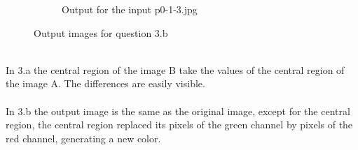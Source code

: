 \begin{enumerate}[label=\emph{\alph*)}]
\begin{figure}[h!]
\begin{subfigure}{0.5\textwidth}
  \caption{Output for the input p0-1-3.jpg}
  \label{fig:sfig2}
\end{subfigure}
\caption{Output images for question 3.b}
\label{fig:fig}
\end{figure}
\\In 3.a the central region of the image B take the values of the central region of the image A. The differences are easily visible.
\\\\In 3.b the output image is the same as the original image, except for the central region, the central region replaced its pixels of the green channel by pixels of the red channel, generating a new color.
\end{enumerate}
